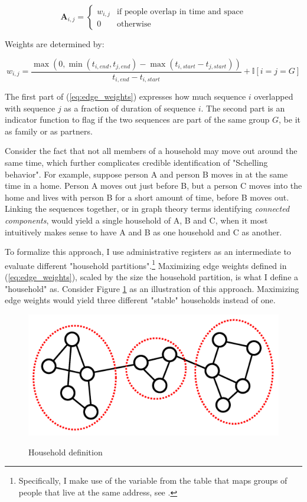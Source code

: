 \documentclass[main.tex]{subfiles}
\begin{document}
\begin{equation}
    \mathbf{A}_{i,j} = \begin{cases}
        w_{i,j} & \text{if people overlap in time and space} \\
        0 & \text{otherwise}
    \end{cases}
\end{equation}

Weights are determined by:

\begin{equation}
    w_{i, j} = \frac{\max(0 , \min(t_{i,end}, t_{j, end}) -\max(t_{i,start}-t_{j, start}))}{t_{i,end}-t_{i,start}} + \mathbb{I}[i=j=G]
    \label{eq:edge_weights}
\end{equation}

The first part of (\ref{eq:edge_weights}) expresses how much sequence $i$ overlapped with sequence $j$ as a fraction of duration of sequence $i$. The second part is an indicator function to flag if the two sequences are part of the same group $G$, be it as family or as partners.

Consider the fact that not all members of a household may move out around the same time, which further complicates credible identification of "Schelling behavior". For example, suppose person A and person B moves in at the same time in a home. Person A moves out just before B, but a person C moves into the home and lives with person B for a short amount of time, before B moves out. Linking the sequences together, or in graph theory terms identifying \textit{connected components}, would yield a single household of A, B and C, when it most intuitively makes sense to have A and B as one household and C as another. 

To formalize this approach, I use administrative registers as an intermediate to evaluate different "household partitions".\footnote{Specifically, I make use of the  variable from the  table that maps groups of people that live at the same address, see \textcite{dst_familie_id}.} Maximizing edge weights defined in (\ref{eq:edge_weights}), scaled by the size the household partition, is what I define a "household" as. Consider Figure \ref{fig:temporal_community_detection} as an illustration of this approach. Maximizing edge weights would yield three different "stable" households instead of one.
\begin{figure}[H]
    \centering
    \caption{Household definition}
    \includegraphics[width=0.4\linewidth]{figs/temporal_community_detection.png}
    \label{fig:temporal_community_detection}
\end{figure}
\end{document}
